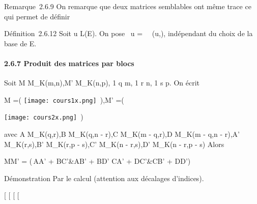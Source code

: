 \documentclass[]{article}
\begin{document}
Remarque~2.6.9 On remarque que deux matrices semblables ont même trace
ce qui permet de définir

Définition~2.6.12 Soit u \in L(E). On pose
~u
=\
\mathrmMat~
(u,), indépendant du choix de la base  de E.

\paragraph{2.6.7 Produit des matrices par blocs}

Soit M \in M\_K(m,n),M' \in M\_K(n,p), 1 \leq q \leq m, 1 \leq r \leq n,
1 \leq s \leq p. On écrit

M =\left ( \texttt{[image: cours1x.png]}
\,\right ),\quad M'
=\left (

\texttt{[image: cours2x.png]} \,\right )

avec A \in M\_K(q,r),B \in M\_K(q,n - r),C \in M\_K(m
- q,r),D \in M\_K(m - q,n - r),A' \in M\_K(r,s),B' \in
M\_K(r,p - s),C' \in M\_K(n - r,s),D' \in M\_K(n -
r,p - s) Alors

MM' = \left (\matrix\,AA'
+ BC'&AB' + BD' \cr CA' + DC'&CB' +
DD'\right )

Démonstration Par le calcul (attention aux décalages d'indices).

{[}
{[}
{[}
{[}
\end{document}
